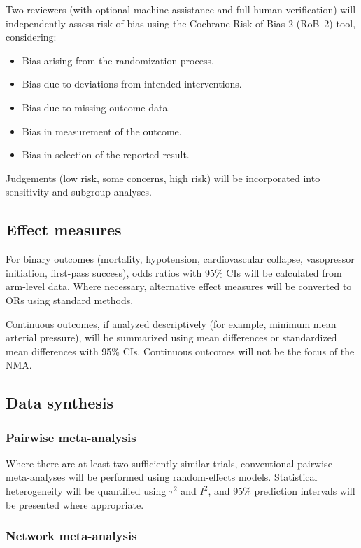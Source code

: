 \documentclass[11pt]{article}
\begin{document}
Two reviewers (with optional machine assistance and full human verification) will independently assess risk of bias using the Cochrane Risk of Bias 2 (RoB~2) tool, considering:

\begin{itemize}
  \item Bias arising from the randomization process.
  \item Bias due to deviations from intended interventions.
  \item Bias due to missing outcome data.
  \item Bias in measurement of the outcome.
  \item Bias in selection of the reported result.
\end{itemize}

Judgements (low risk, some concerns, high risk) will be incorporated into sensitivity and subgroup analyses.

\subsection{Effect measures}

For binary outcomes (mortality, hypotension, cardiovascular collapse, vasopressor initiation, first-pass success), odds ratios with 95\% CIs will be calculated from arm-level data. Where necessary, alternative effect measures will be converted to ORs using standard methods.

Continuous outcomes, if analyzed descriptively (for example, minimum mean arterial pressure), will be summarized using mean differences or standardized mean differences with 95\% CIs. Continuous outcomes will not be the focus of the NMA.

\subsection{Data synthesis}

\subsubsection{Pairwise meta-analysis}

Where there are at least two sufficiently similar trials, conventional pairwise meta-analyses will be performed using random-effects models. Statistical heterogeneity will be quantified using $\tau^2$ and $I^2$, and 95\% prediction intervals will be presented where appropriate.

\subsubsection{Network meta-analysis}
\end{document}
